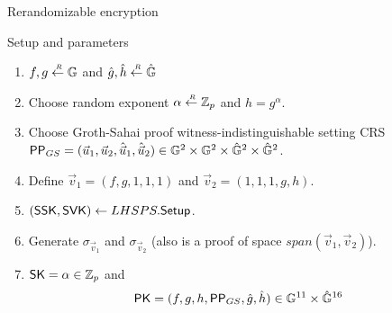 \begin{frame}{Rerandomizable encryption}
  \begin{block}{Setup and parameters}
    \begin{enumerate}
    \item $f,g \stackrel{{\scriptscriptstyle \mkern4mu R}}{\gets} \mathbb{G}$ and $\hat{g}, \hat{h} \stackrel{{\scriptscriptstyle \mkern4mu R}}{\gets} \hat{\mathbb{G}}$
    \item Choose random exponent $\alpha \stackrel{{\scriptscriptstyle \mkern4mu R}}{\gets} \mathbb{Z}_p$ and $h = g^\alpha$.
    \item Choose Groth-Sahai proof witness-indistinguishable setting CRS $\mathsf{PP}_{GS} = (\vec{u}_1, \vec{u}_2, \hat{\vec{u}}_1, \hat{\vec{u}}_2) \in \mathbb{G}^2 \times \mathbb{G}^2 \times \hat{\mathbb{G}}^2 \times \hat{\mathbb{G}}^2$.
    \item Define $\vec{v}_1 = (f, g, 1, 1, 1)$ and $\vec{v}_2 = (1, 1, 1, g, h)$.
    \item $(\mathsf{SSK}, \mathsf{SVK}) \gets LHSPS.{\mathsf{Setup}}$.
    \item Generate $\sigma_{\vec{v}_1}$ and $\sigma_{\vec{v}_2}$ (also is a proof of space $span(\vec{v}_1, \vec{v}_2)$).
    \item $\mathsf{SK} = \alpha \in \mathbb{Z}_p$ and
      \begin{align*}
        \mathsf{PK} &= (f,g,h,\mathsf{PP}_{GS}, \hat{g}, \hat{h}) \in \mathbb{G}^{11} \times \hat{\mathbb{G}}^{16}
      \end{align*}
    \end{enumerate}
  \end{block}
\end{frame}


